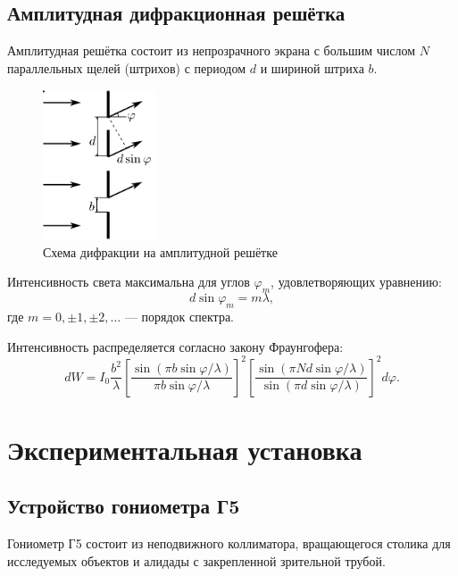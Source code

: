 \documentclass[a4paper,12pt]{article}
\begin{document}
\subsection*{Амплитудная дифракционная решётка}

Амплитудная решётка состоит из непрозрачного экрана с большим числом $N$ параллельных щелей (штрихов) с периодом $d$ и шириной штриха $b$.

\FloatBarrier
\begin{figure}[h]
    \centering
    \includegraphics[width=0.3\textwidth]{difraction.png}
    \caption{Схема дифракции на амплитудной решётке}
    \label{pic:difraction}
\end{figure}
\FloatBarrier

Интенсивность света максимальна для углов $\varphi_m$, удовлетворяющих уравнению:
\begin{equation}
    d \sin \varphi_m = m \lambda,
\end{equation}
где $m = 0, \pm 1, \pm 2, \dots$ — порядок спектра.

Интенсивность распределяется согласно закону Фраунгофера:
\begin{equation}
    dW = I_0 \frac{b^2}{\lambda} \left[\frac{\sin(\pi b \sin \varphi / \lambda)}{\pi b \sin \varphi / \lambda}\right]^2 \left[\frac{\sin(\pi N d \sin \varphi / \lambda)}{\sin(\pi d \sin \varphi / \lambda)}\right]^2 d\varphi.
\end{equation}

\section{Экспериментальная установка}

\subsection*{Устройство гониометра Г5}

Гониометр Г5 состоит из неподвижного коллиматора, вращающегося столика для исследуемых объектов и алидады с закрепленной зрительной трубой.
\end{document}
